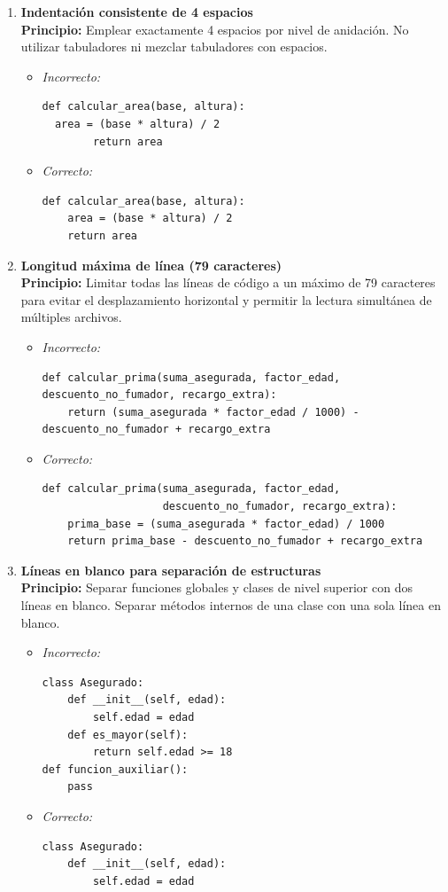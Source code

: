 \documentclass[12pt, letterpaper]{article}
\begin{document}
\begin{enumerate}
    \item \textbf{Indentación consistente de 4 espacios} \\
    \textbf{Principio:} Emplear exactamente 4 espacios por nivel de anidación. No utilizar tabuladores ni mezclar tabuladores con espacios.
    \begin{itemize}
        \item \textit{Incorrecto:}
\begin{verbatim}
def calcular_area(base, altura):
  area = (base * altura) / 2
        return area
\end{verbatim}
        \item \textit{Correcto:}
\begin{verbatim}
def calcular_area(base, altura):
    area = (base * altura) / 2
    return area
\end{verbatim}
    \end{itemize}

    \item \textbf{Longitud máxima de línea (79 caracteres)} \\
    \textbf{Principio:} Limitar todas las líneas de código a un máximo de 79 caracteres para evitar el desplazamiento horizontal y permitir la lectura simultánea de múltiples archivos.
    \begin{itemize}
        \item \textit{Incorrecto:}
\begin{verbatim}
def calcular_prima(suma_asegurada, factor_edad, descuento_no_fumador, recargo_extra):
    return (suma_asegurada * factor_edad / 1000) - descuento_no_fumador + recargo_extra
\end{verbatim}
        \item \textit{Correcto:}
\begin{verbatim}
def calcular_prima(suma_asegurada, factor_edad, 
                   descuento_no_fumador, recargo_extra):
    prima_base = (suma_asegurada * factor_edad) / 1000
    return prima_base - descuento_no_fumador + recargo_extra
\end{verbatim}
    \end{itemize}

    \item \textbf{Líneas en blanco para separación de estructuras} \\
    \textbf{Principio:} Separar funciones globales y clases de nivel superior con dos líneas en blanco. Separar métodos internos de una clase con una sola línea en blanco.
    \begin{itemize}
        \item \textit{Incorrecto:}
\begin{verbatim}
class Asegurado:
    def __init__(self, edad):
        self.edad = edad
    def es_mayor(self):
        return self.edad >= 18
def funcion_auxiliar():
    pass
\end{verbatim}
        \item \textit{Correcto:}
\begin{verbatim}
class Asegurado:
    def __init__(self, edad):
        self.edad = edad


\end{verbatim}
\end{itemize}
\end{enumerate}
\end{document}
